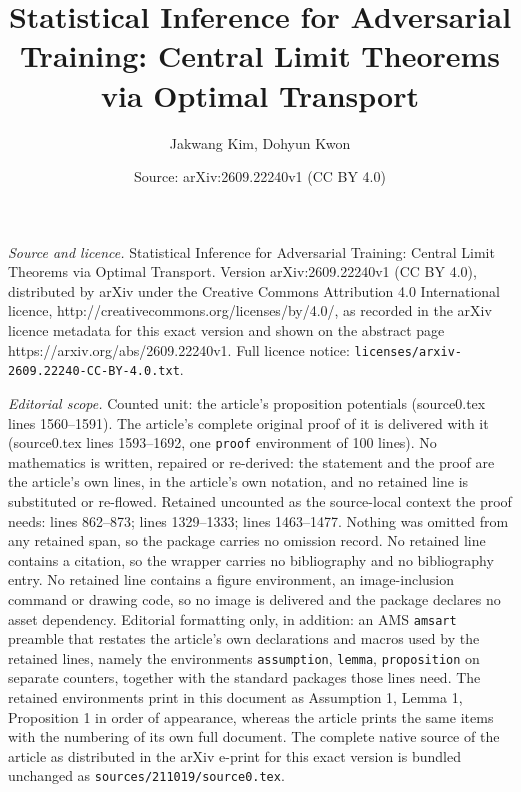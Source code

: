 \documentclass[10pt,a4paper]{amsart}
\title{Statistical Inference for Adversarial Training: Central Limit Theorems via Optimal Transport}
\author{Jakwang Kim, Dohyun Kwon}
\date{Source: arXiv:2609.22240v1 (CC BY 4.0)}
\begin{document}
\maketitle

\noindent\emph{Source and licence.} Statistical Inference for Adversarial Training: Central Limit Theorems via Optimal Transport. Version arXiv:2609.22240v1 (CC BY 4.0), distributed by arXiv under the Creative Commons Attribution 4.0 International licence, http://creativecommons.org/licenses/by/4.0/, as recorded in the arXiv licence metadata for this exact version and shown on the abstract page https://arxiv.org/abs/2609.22240v1. Full licence notice: \texttt{licenses/arxiv-2609.22240-CC-BY-4.0.txt}.\par\smallskip

\noindent\textit{Editorial scope.} Counted unit: the article's proposition potentials (source0.tex lines 1560--1591). The article's complete original proof of it is delivered with it (source0.tex lines 1593--1692, one \texttt{proof} environment of 100 lines). No mathematics is written, repaired or re-derived: the statement and the proof are the article's own lines, in the article's own notation, and no retained line is substituted or re-flowed.  Retained uncounted as the source-local context the proof needs: lines 862--873; lines 1329--1333; lines 1463--1477.  Nothing was omitted from any retained span, so the package carries no omission record.  No retained line contains a citation, so the wrapper carries no bibliography and no bibliography entry.  No retained line contains a figure environment, an image-inclusion command or drawing code, so no image is delivered and the package declares no asset dependency.  Editorial formatting only, in addition: an AMS \texttt{amsart} preamble that restates the article's own declarations and macros used by the retained lines, namely the environments \texttt{assumption}, \texttt{lemma}, \texttt{proposition} on separate counters, together with the standard packages those lines need.  The retained environments print in this document as Assumption 1, Lemma 1, Proposition 1 in order of appearance, whereas the article prints the same items with the numbering of its own full document.  The complete native source of the article as distributed in the arXiv e-print for this exact version is bundled unchanged as \texttt{sources/211019/source0.tex}.
\end{document}
